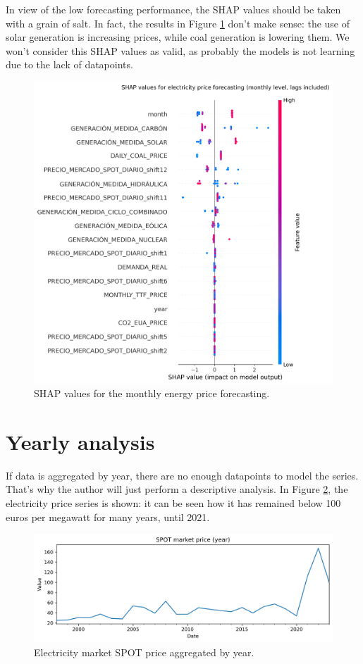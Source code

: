 In view of the low forecasting performance, the SHAP values should be taken with a grain of salt. In fact, the results in Figure \ref{fig:shap-monthly} don't make sense: the use of solar generation is increasing prices, while coal generation is lowering them. We won't consider this SHAP values as valid, as probably the models is not learning due to the lack of datapoints.

\begin{figure}[H]
\centering
    \centering
    \includegraphics[width=0.7\linewidth]{images/analysis/shap-monthly}
    \caption{SHAP values for the monthly energy price forecasting.}
    \label{fig:shap-monthly}
\end{figure}


\section{Yearly analysis}

If data is aggregated by year, there are no enough datapoints to model the series. That's why the author will just perform a descriptive analysis. In Figure \ref{fig:spot-yearly}, the electricity price series is shown: it can be seen how it has remained below 100 euros per megawatt for many years, until 2021.

\begin{figure}[H]
\centering
    \centering
    \includegraphics[width=0.7\linewidth]{images/analysis/spot-yearly}
    \caption{Electricity market SPOT price aggregated by year.}
    \label{fig:spot-yearly}
\end{figure}

